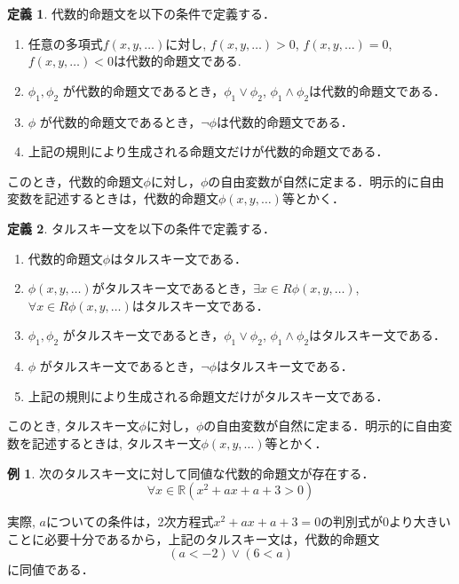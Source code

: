 \documentclass[uplatex, dvipdfmx]{jsarticle}
\newcommand{\R}{\mathbb{R}}
\theoremstyle{definition}
\newtheorem{definition}{定義}[section]
\newtheorem{example}{例}[section]
\begin{document}

\begin{definition}
     代数的命題文を以下の条件で定義する．
     \begin{enumerate}
          \item 任意の多項式$f(x, y, \dots)$に対し, $f(x,y, \dots) > 0$, $f(x,y, \dots) = 0$, $f(x,y, \dots) < 0$は代数的命題文である.
          \item $\phi_1, \phi_2$ が代数的命題文であるとき，$\phi_1 \lor \phi_2$, $\phi_1 \land \phi_2$は代数的命題文である．
          \item $\phi$ が代数的命題文であるとき，$\lnot \phi$は代数的命題文である．
          \item 上記の規則により生成される命題文だけが代数的命題文である．
     \end{enumerate}
     このとき，代数的命題文$\phi$に対し，$\phi$の自由変数が自然に定まる．明示的に自由変数を記述するときは，代数的命題文$\phi(x,y,\dots)$等とかく．
\end{definition}

\begin{definition}
     タルスキー文を以下の条件で定義する．
     \begin{enumerate}
          \item 代数的命題文$\phi$はタルスキー文である．
          \item $\phi(x,y,\dots)$がタルスキー文であるとき，$\exists x \in R \phi(x,y,\dots)$, $\forall x \in R \phi(x,y,\dots)$はタルスキー文である．
          \item $\phi_1, \phi_2$ がタルスキー文であるとき，$\phi_1 \lor \phi_2$, $\phi_1 \land \phi_2$はタルスキー文である．
          \item $\phi$ がタルスキー文であるとき，$\lnot \phi$はタルスキー文である．
          \item 上記の規則により生成される命題文だけがタルスキー文である．
     \end{enumerate}
     このとき, タルスキー文$\phi$に対し，$\phi$の自由変数が自然に定まる．明示的に自由変数を記述するときは, タルスキー文$\phi(x, y, \dots)$等とかく． 
\end{definition}

\begin{example}
     次のタルスキー文に対して同値な代数的命題文が存在する．
     \begin{equation*}
          \forall x \in \R (x^2 + ax + a + 3 > 0)
     \end{equation*}

     実際, $a$についての条件は，2次方程式$x^2 + ax + a + 3 = 0$の判別式が0より大きいことに必要十分であるから，上記のタルスキー文は，代数的命題文
     \begin{equation*}
          (a < -2) \lor (6 < a)
     \end{equation*}
     に同値である．
\end{example}
\end{document}
